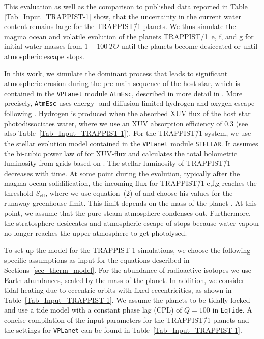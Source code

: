 \documentclass[oneside,twocolumn]{article}
\newcommand{\vplanet}{\texttt{\footnotesize{VPLanet}}}
\newcommand{\atmesc}{\texttt{\footnotesize{AtmEsc}}}
\newcommand{\eqtide}{\texttt{\footnotesize{EqTide}}}
\newcommand{\stellar}{\texttt{\footnotesize{STELLAR}}}
\begin{document}
This evaluation as well as the comparison to published data reported in Table \ref{Tab_Input_TRAPPIST-1} show, that the uncertainty in the current water content remains
large for the TRAPPIST\=/1 planets. We thus simulate the magma ocean and volatile evolution of the planets TRAPPIST\=/1~e, f, and g for initial water masses from $1-\SI{100}{TO}$ until the planets become desiccated or until atmospheric escape stops.

In this work, we simulate the dominant process that leads to significant atmospheric erosion during the pre-main sequence of the host star, which is contained in the \vplanet{} module \atmesc{}, described in more detail in \citet{Barnes2020}. More precisely, \atmesc{} uses energy- and diffusion limited hydrogen and oxygen escape following \citet{Luger2015a,Luger2015}. Hydrogen is produced when the absorbed XUV flux of the host star photodissociates water, where we use an XUV absorption efficiency of 0.3 (see also Table~\ref{Tab_Input_TRAPPIST-1}). For the TRAPPIST\=/1 system, we use the stellar evolution model contained in the \vplanet{} module \stellar{}. It assumes the bi-cubic power law of \citet{Ribas2005} for XUV-flux and calculates the total bolometric luminosity from grids based on \citet{Baraffe2015}. The stellar luminosity of TRAPPIST\=/1 decreases with time. At some point during the evolution, typically after the magma ocean solidification, the incoming flux for TRAPPIST\=/1 e,f,g  reaches the threshold $S_\mathrm{eff}$, where we use equation~(2) of \citet{Kopparapu2013} and choose his values for the runaway greenhouse limit. This limit depends on the mass of the planet \citep{Kopparapu2014}.
At this  point, we assume that the pure steam atmosphere condenses out. 
Furthermore, the stratosphere desiccates and atmospheric escape of  stops because water vapour no longer reaches the upper atmosphere to get photolysed.

To set up the model for the TRAPPIST-1 simulations, we choose the following specific assumptions as input for the equations described in Sections~\ref{sec_therm_model}.
For the abundance of radioactive isotopes we use Earth abundances, scaled by the mass of the planet. In addition, we consider tidal heating due to eccentric orbits with fixed eccentricities, as shown in Table~\ref{Tab_Input_TRAPPIST-1}. We assume the planets to be tidally locked and use a tide model with a constant phase lag (CPL) of $Q = 100$ in \eqtide{}. 
A concise compilation of the input parameters for the TRAPPIST\=/1 planets and the settings for \vplanet{} can be found in Table~\ref{Tab_Input_TRAPPIST-1}. 
\end{document}
